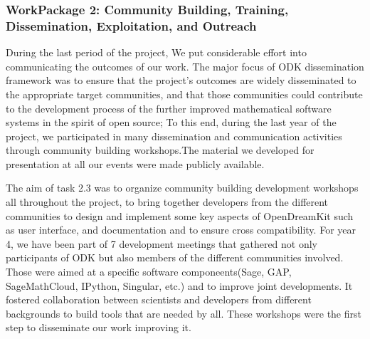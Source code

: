 \subsubsection{WorkPackage 2:  Community Building, Training, Dissemination, Exploitation, and Outreach}
\label{dissem}



During the last period of the project, We  put considerable effort into communicating the outcomes of our work. The major focus of ODK dissemination framework was to ensure that the project’s outcomes  are widely  disseminated  to  the  appropriate  target communities,  and that those communities could contribute to the development process of the further improved mathematical software systems in the spirit of open source; To this end, during the last year of the project, we participated in many dissemination and communication activities through community building workshops.The material we developed for presentation at all our events were made publicly available.

The aim of  task 2.3 was to organize community building development workshops all throughout the project, to bring together developers from the different communities to design and implement some key aspects of OpenDreamKit such as user interface, and documentation and to ensure cross compatibility. For year 4, we have been part of 7 development meetings that gathered not only participants of ODK but also members of the different communities involved. Those were aimed at a specific software componeents(Sage, GAP, SageMathCloud, IPython, Singular, etc.) and to improve joint developments. It fostered collaboration between scientists and developers from different backgrounds to build tools that are needed by all. These workshops were the first step to disseminate our work improving it. 

